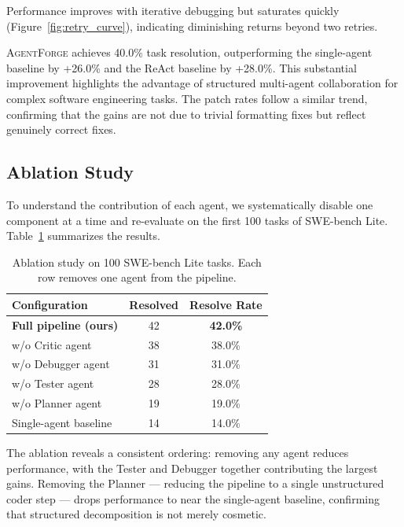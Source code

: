 \documentclass[journal]{IEEEtran}
\newcommand{\agentforge}{\textsc{AgentForge}}
\begin{document}
Performance improves with iterative debugging but saturates quickly (Figure~\ref{fig:retry_curve}), indicating diminishing returns beyond two retries.




\agentforge{} achieves 40.0\% task resolution, outperforming the single-agent baseline by +26.0\% and the ReAct baseline by +28.0\%. This substantial improvement highlights the advantage of structured multi-agent collaboration for complex software engineering tasks. The patch rates follow a similar trend, confirming that the gains are not due to trivial formatting fixes but reflect genuinely correct fixes.

\subsection{Ablation Study}
\label{sec:ablation}

To understand the contribution of each agent, we systematically disable one component at a time and re-evaluate on the first 100 tasks of SWE-bench Lite. Table~\ref{tab:ablation} summarizes the results.

\begin{table}[t]
\centering
\caption{Ablation study on 100 SWE-bench Lite tasks. Each row removes one agent from the pipeline.}
\label{tab:ablation}
\begin{tabular}{lcc}
\toprule
Configuration             & Resolved & Resolve Rate \\
\midrule
\textbf{Full pipeline (ours)} & 42 & \textbf{42.0\%} \\
w/o Critic agent          & 38 & 38.0\% \\
w/o Debugger agent        & 31 & 31.0\% \\
w/o Tester agent          & 28 & 28.0\% \\
w/o Planner agent         & 19 & 19.0\% \\
Single-agent baseline     & 14 & 14.0\% \\
\bottomrule
\end{tabular}
\end{table}

The ablation reveals a consistent ordering: removing any agent reduces performance, with the Tester and Debugger together contributing the largest gains. Removing the Planner — reducing the pipeline to a single unstructured coder step — drops performance to near the single-agent baseline, confirming that structured decomposition is not merely cosmetic.
\end{document}
